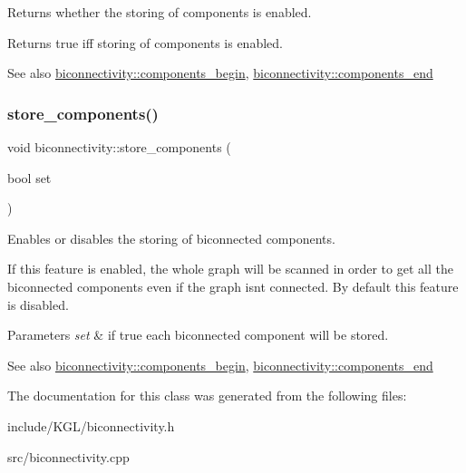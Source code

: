 Returns whether the storing of components is enabled. 

\begin{DoxyReturn}{Returns}
true iff storing of components is enabled. 
\end{DoxyReturn}
\begin{DoxySeeAlso}{See also}
\mbox{\hyperlink{classbiconnectivity_ac0b7253533edc3f1412f771cb35bf04a}{biconnectivity\+::components\+\_\+begin}}, \mbox{\hyperlink{classbiconnectivity_a0bd1c70975e664174e591efd64f8dc71}{biconnectivity\+::components\+\_\+end}} 
\end{DoxySeeAlso}
\mbox{\label{classbiconnectivity_ab7c9e256a4d7a4ffea33b20f014e1f69}} 
\subsubsection{\texorpdfstring{store\+\_\+components()}{store\_components()}\hspace{0.1cm}{\footnotesize\ttfamily [2/2]}}
{\footnotesize\ttfamily void biconnectivity\+::store\+\_\+components (\begin{DoxyParamCaption}\item[{bool}]{set }\end{DoxyParamCaption})\hspace{0.3cm}{\ttfamily [inline]}}



Enables or disables the storing of biconnected components. 

If this feature is enabled, the whole graph will be scanned in order to get all the biconnected components even if the graph isn\textquotesingle{}t connected. By default this feature is disabled.


\begin{DoxyParams}{Parameters}
{\em set} & if true each biconnected component will be stored. \\
\hline
\end{DoxyParams}
\begin{DoxySeeAlso}{See also}
\mbox{\hyperlink{classbiconnectivity_ac0b7253533edc3f1412f771cb35bf04a}{biconnectivity\+::components\+\_\+begin}}, \mbox{\hyperlink{classbiconnectivity_a0bd1c70975e664174e591efd64f8dc71}{biconnectivity\+::components\+\_\+end}} 
\end{DoxySeeAlso}


The documentation for this class was generated from the following files\+:\begin{DoxyCompactItemize}
\item 
include/\+K\+G\+L/biconnectivity.\+h\item 
src/biconnectivity.\+cpp\end{DoxyCompactItemize}
